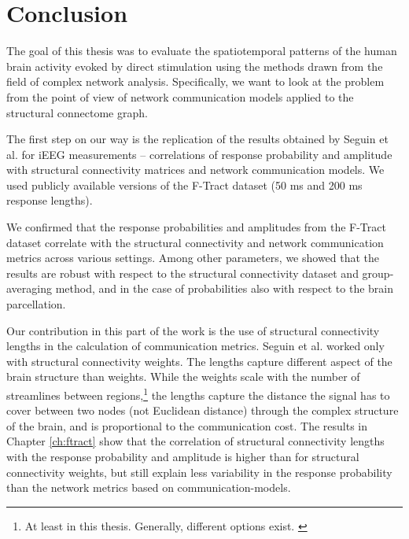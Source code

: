 \chapter*{Conclusion}

The goal of this thesis was to evaluate the spatiotemporal patterns of the human brain activity evoked by direct stimulation using the methods drawn from the field of complex network analysis. Specifically, we want to look at the problem from the point of view of network communication models applied to the structural connectome graph. 

The first step on our way is the replication of the results obtained by Seguin et al. \cite{seguin_communication_2023} for iEEG measurements -- correlations of response probability and amplitude with structural connectivity matrices and network communication models. We used publicly available versions of the F-Tract dataset (50 ms and 200 ms response lengths).

We confirmed that the response probabilities and amplitudes from the F-Tract dataset correlate with the structural connectivity and network communication metrics across various settings. Among other parameters, we showed that the results are robust with respect to the structural connectivity dataset and group-averaging method, and in the case of probabilities also with respect to the brain parcellation. 

Our contribution in this part of the work is the use of structural connectivity lengths in the calculation of communication metrics. Seguin et al. \cite{seguin_communication_2023} worked only with structural connectivity weights. The lengths capture different aspect of the brain structure than weights. While the weights scale with the number of streamlines between regions,\footnote{At least in this thesis. Generally, different options exist. \cite{zhang_quantitative_2022}} the lengths capture the distance the signal has to cover between two nodes (not Euclidean distance) through the complex structure of the brain, and is proportional to the communication cost. The results in Chapter \ref{ch:ftract} show that the correlation of structural connectivity lengths with the response probability and amplitude is higher than for structural connectivity weights, but still explain less variability in the response probability than the network metrics based on communication-models.

